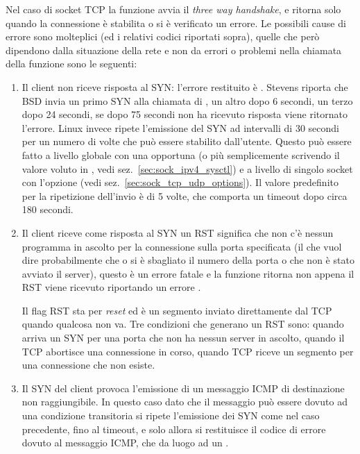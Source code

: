 Nel caso di socket TCP la funzione  avvia il \textit{three way
  handshake}, e ritorna solo quando la connessione è stabilita o si è
verificato un errore. Le possibili cause di errore sono molteplici (ed i
relativi codici riportati sopra), quelle che però dipendono dalla situazione
della rete e non da errori o problemi nella chiamata della funzione sono le
seguenti:
\begin{enumerate}
\item Il client non riceve risposta al SYN: l'errore restituito è
  . Stevens riporta che BSD invia un primo SYN alla
  chiamata di , un altro dopo 6 secondi, un terzo dopo 24
  secondi, se dopo 75 secondi non ha ricevuto risposta viene ritornato
  l'errore. Linux invece ripete l'emissione del SYN ad intervalli di 30
  secondi per un numero di volte che può essere stabilito dall'utente. Questo
  può essere fatto a livello globale con una opportuna  (o più
  semplicemente scrivendo il valore voluto in
  , vedi
  sez.~\ref{sec:sock_ipv4_sysctl}) e a livello di singolo socket con l'opzione
   (vedi sez.~\ref{sec:sock_tcp_udp_options}). Il valore
  predefinito per la ripetizione dell'invio è di 5 volte, che comporta un
  timeout dopo circa 180 secondi.

\item Il client riceve come risposta al SYN un RST significa che non c'è
  nessun programma in ascolto per la connessione sulla porta specificata (il
  che vuol dire probabilmente che o si è sbagliato il numero della porta o che
  non è stato avviato il server), questo è un errore fatale e la funzione
  ritorna non appena il RST viene ricevuto riportando un errore
  .
  
  Il flag RST sta per \textit{reset} ed è un segmento inviato direttamente
  dal TCP quando qualcosa non va. Tre condizioni che generano un RST sono:
  quando arriva un SYN per una porta che non ha nessun server in ascolto,
  quando il TCP abortisce una connessione in corso, quando TCP riceve un
  segmento per una connessione che non esiste.
  
\item Il SYN del client provoca l'emissione di un messaggio ICMP di
  destinazione non raggiungibile. In questo caso dato che il messaggio può
  essere dovuto ad una condizione transitoria si ripete l'emissione dei SYN
  come nel caso precedente, fino al timeout, e solo allora si restituisce il
  codice di errore dovuto al messaggio ICMP, che da luogo ad un
  .
   
\end{enumerate}

